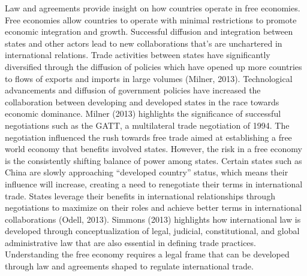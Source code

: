 \documentclass[11pt]{article}
\begin{document}
Law and agreements provide insight on how countries operate in free economies. Free economies allow countries to operate with minimal restrictions to promote economic integration and growth. Successful diffusion and integration between states and other actors lead to new collaborations that's are unchartered in international relations. Trade activities between states have significantly diversified through the diffusion of policies which have opened up more countries to flows of exports and imports in large volumes (Milner, 2013). Technological advancements and diffusion of government policies have increased the collaboration between developing and developed states in the race towards economic dominance. Milner (2013) highlights the significance of successful negotiations such as the GATT, a multilateral trade negotiation of 1994. The negotiation influenced the rush towards free trade aimed at establishing a free world economy that benefits involved states. However, the risk in a free economy is the consistently shifting balance of power among states. Certain states such as China are slowly approaching “developed country” status, which means their influence will increase, creating a need to renegotiate their terms in international trade. States leverage their benefits in international relationships through negotiations to maximize on their roles and achieve better terms in international collaborations (Odell, 2013). Simmons (2013) highlights how international law is developed through conceptualization of legal, judicial, constitutional, and global administrative law that are also essential in defining trade practices. Understanding the free economy requires a legal frame that can be developed through law and agreements shaped to regulate international trade.
\end{document}
